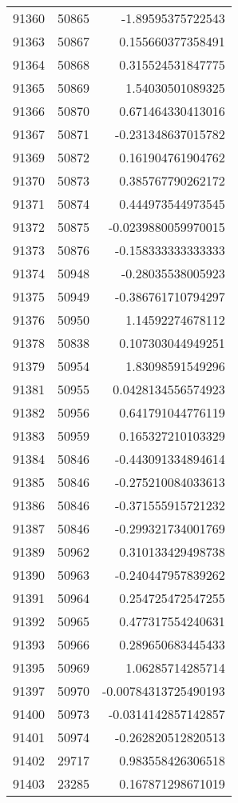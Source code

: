 \begin{tabular}{r | r | r}
91360 & 50865 & -1.89595375722543 \\
91363 & 50867 & 0.155660377358491 \\
91364 & 50868 & 0.315524531847775 \\
91365 & 50869 & 1.54030501089325 \\
91366 & 50870 & 0.671464330413016 \\
91367 & 50871 & -0.231348637015782 \\
91369 & 50872 & 0.161904761904762 \\
91370 & 50873 & 0.385767790262172 \\
91371 & 50874 & 0.444973544973545 \\
91372 & 50875 & -0.0239880059970015 \\
91373 & 50876 & -0.158333333333333 \\
91374 & 50948 & -0.28035538005923 \\
91375 & 50949 & -0.386761710794297 \\
91376 & 50950 & 1.14592274678112 \\
91378 & 50838 & 0.107303044949251 \\
91379 & 50954 & 1.83098591549296 \\
91381 & 50955 & 0.0428134556574923 \\
91382 & 50956 & 0.641791044776119 \\
91383 & 50959 & 0.165327210103329 \\
91384 & 50846 & -0.443091334894614 \\
91385 & 50846 & -0.275210084033613 \\
91386 & 50846 & -0.371555915721232 \\
91387 & 50846 & -0.299321734001769 \\
91389 & 50962 & 0.310133429498738 \\
91390 & 50963 & -0.240447957839262 \\
91391 & 50964 & 0.254725472547255 \\
91392 & 50965 & 0.477317554240631 \\
91393 & 50966 & 0.289650683445433 \\
91395 & 50969 & 1.06285714285714 \\
91397 & 50970 & -0.00784313725490193 \\
91400 & 50973 & -0.0314142857142857 \\
91401 & 50974 & -0.262820512820513 \\
91402 & 29717 & 0.983558426306518 \\
91403 & 23285 & 0.167871298671019 \\

\end{tabular}
